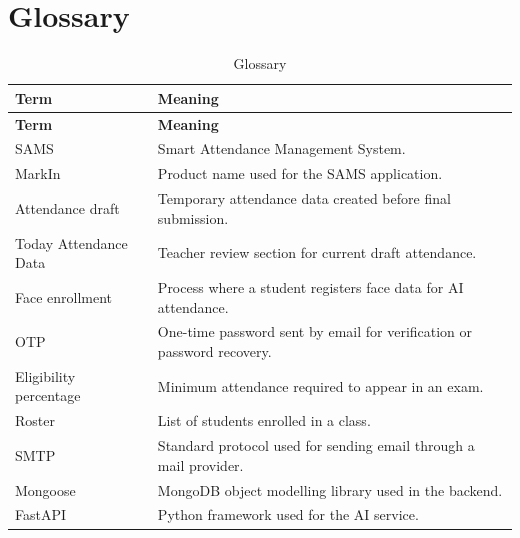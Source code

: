 \section{Glossary}

\begin{longtable}{p{3.3cm} p{10cm}}
\caption{Glossary}
\label{tab:glossary}\\
\toprule
\textbf{Term} & \textbf{Meaning}\\
\midrule
\endfirsthead
\toprule
\textbf{Term} & \textbf{Meaning}\\
\midrule
\endhead
SAMS & Smart Attendance Management System.\\
MarkIn & Product name used for the SAMS application.\\
Attendance draft & Temporary attendance data created before final submission.\\
Today Attendance Data & Teacher review section for current draft attendance.\\
Face enrollment & Process where a student registers face data for AI attendance.\\
OTP & One-time password sent by email for verification or password recovery.\\
Eligibility percentage & Minimum attendance required to appear in an exam.\\
Roster & List of students enrolled in a class.\\
SMTP & Standard protocol used for sending email through a mail provider.\\
Mongoose & MongoDB object modelling library used in the backend.\\
FastAPI & Python framework used for the AI service.\\
\bottomrule
\end{longtable}
